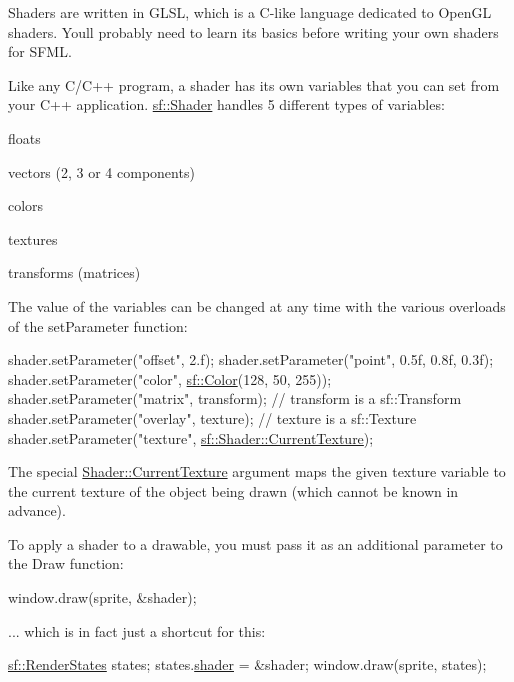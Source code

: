 Shaders are written in G\+L\+SL, which is a C-\/like language dedicated to Open\+GL shaders. You\textquotesingle{}ll probably need to learn its basics before writing your own shaders for S\+F\+ML.

Like any C/\+C++ program, a shader has its own variables that you can set from your C++ application. \hyperlink{classsf_1_1Shader}{sf\+::\+Shader} handles 5 different types of variables\+: \begin{DoxyItemize}
\item floats \item vectors (2, 3 or 4 components) \item colors \item textures \item transforms (matrices)\end{DoxyItemize}
The value of the variables can be changed at any time with the various overloads of the set\+Parameter function\+: 
\begin{DoxyCode}
shader.setParameter(\textcolor{stringliteral}{"offset"}, 2.f);
shader.setParameter(\textcolor{stringliteral}{"point"}, 0.5f, 0.8f, 0.3f);
shader.setParameter(\textcolor{stringliteral}{"color"}, \hyperlink{classsf_1_1Color}{sf::Color}(128, 50, 255));
shader.setParameter(\textcolor{stringliteral}{"matrix"}, transform); \textcolor{comment}{// transform is a sf::Transform}
shader.setParameter(\textcolor{stringliteral}{"overlay"}, texture); \textcolor{comment}{// texture is a sf::Texture}
shader.setParameter(\textcolor{stringliteral}{"texture"}, \hyperlink{classsf_1_1Shader_ac84c7953eec2e19358ea6e2cc5385b8d}{sf::Shader::CurrentTexture});
\end{DoxyCode}


The special \hyperlink{classsf_1_1Shader_ac84c7953eec2e19358ea6e2cc5385b8d}{Shader\+::\+Current\+Texture} argument maps the given texture variable to the current texture of the object being drawn (which cannot be known in advance).

To apply a shader to a drawable, you must pass it as an additional parameter to the Draw function\+: 
\begin{DoxyCode}
window.draw(sprite, &shader);
\end{DoxyCode}


... which is in fact just a shortcut for this\+: 
\begin{DoxyCode}
\hyperlink{classsf_1_1RenderStates}{sf::RenderStates} states;
states.\hyperlink{classsf_1_1RenderStates_ad4f79ecdd0c60ed0d24fbe555b221bd8}{shader} = &shader;
window.draw(sprite, states);
\end{DoxyCode}


